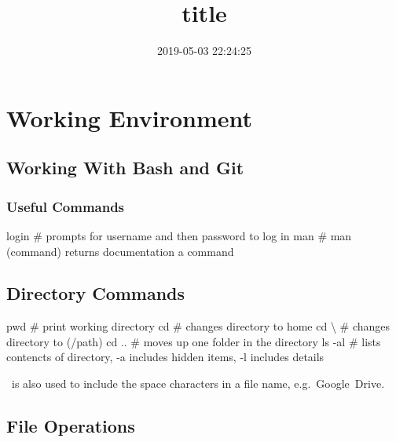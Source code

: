 \documentclass[]{article}
\title{title}
\author{}
\date{2019-05-03 22:24:25}
\newenvironment{Shaded}{\begin{snugshade}}{\end{snugshade}}
\newcommand{\DataTypeTok}[1]{\textcolor[rgb]{0.13,0.29,0.53}{#1}}
\newcommand{\FunctionTok}[1]{\textcolor[rgb]{0.00,0.00,0.00}{#1}}
\newcommand{\BuiltInTok}[1]{#1}
\newcommand{\ExtensionTok}[1]{#1}
\newcommand{\NormalTok}[1]{#1}
\begin{document}
\maketitle

{
\setcounter{tocdepth}{3}
\tableofcontents
}
\section{Working Environment}\label{working-environment}

\subsection{Working With Bash and Git}\label{working-with-bash-and-git}

\subsubsection{Useful Commands}\label{useful-commands}

\begin{Shaded}
\begin{Highlighting}[]
\FunctionTok{login}\NormalTok{     # prompts for username and then password to log in}
\FunctionTok{man}\NormalTok{       # man (command) }\ExtensionTok{returns}\NormalTok{ documentation a command}
\end{Highlighting}
\end{Shaded}

\subsection{Directory Commands}

\begin{Shaded}
\begin{Highlighting}[]
\BuiltInTok{pwd}\NormalTok{       # print working directory}
\BuiltInTok{cd}\NormalTok{        # changes directory to home}
\BuiltInTok{cd} \DataTypeTok{\textbackslash{} }\NormalTok{     # changes directory to (/path)}
\BuiltInTok{cd}\NormalTok{ ..     # moves up one folder in the directory}
\FunctionTok{ls}\NormalTok{ -al    # lists contencts of directory, -a includes hidden items, -l includes details}
\end{Highlighting}
\end{Shaded}

~is also used to include the space characters in a file name,
e.g.~Google~Drive.

\subsection{File Operations}
\end{document}
